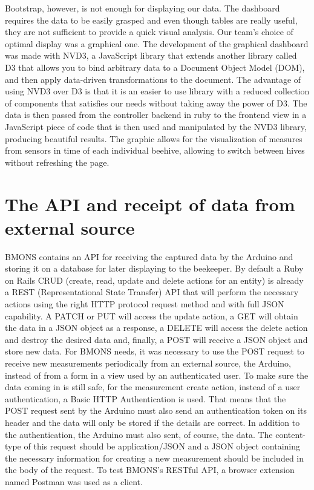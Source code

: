 Bootstrap, however, is not enough for displaying our data. The dashboard requires the data to be easily grasped and even though tables are really useful, they are not sufficient to provide a quick visual analysis. Our team's choice of optimal display was a graphical one. The development of the graphical dashboard was made with NVD3, a JavaScript library that extends another library called D3 that allows you to bind arbitrary data to a Document Object Model (DOM), and then apply data-driven transformations to the document. The advantage of using NVD3 over D3 is that it is an easier to use library with a reduced collection of components that satisfies our needs without taking away the power of D3. The data is then passed from the controller backend in ruby to the frontend view in a JavaScript piece of code that is then used and manipulated by the NVD3 library, producing beautiful results. The graphic allows for the visualization of measures from sensors in time of each individual beehive, allowing to switch between hives without refreshing the page. 

\section{The API and receipt of data from external source}

BMONS contains an API for receiving the captured data by the Arduino and storing it on a database for later displaying to the beekeeper. By default a Ruby on Rails CRUD (create, read, update and delete actions for an entity) is already a REST (Representational State Transfer) API that will perform the necessary actions using the right HTTP protocol request method and with full JSON capability. A PATCH or PUT will access the update action, a GET will obtain the data in a JSON object as a response, a DELETE will access the delete action and destroy the desired data and, finally, a POST will receive a JSON object and store new data. For BMONS needs, it was necessary to use the POST request to receive new measurements periodically from an external source, the Arduino, instead of from a form in a view used by an authenticated user. To make sure the data coming in is still safe, for the measurement create action, instead of a user authentication, a Basic HTTP Authentication is used. That means that the POST request sent by the Arduino must also send an authentication token on its header and the data will only be stored if the details are correct. In addition to the authentication, the Arduino must also sent, of course, the data. The content-type of this request should be application/JSON and a JSON object containing the necessary information for creating a new measurement should be included in the body of the request. To test BMONS's RESTful API, a browser extension named Postman was used as a client. 
